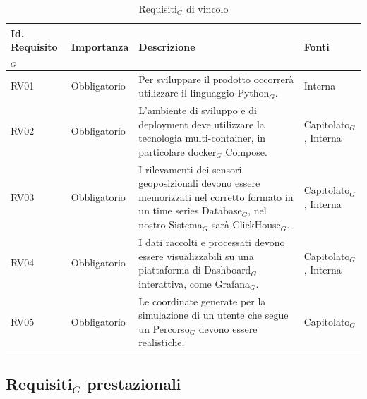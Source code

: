 \documentclass[10pt]{article}
\begin{document}
\begin{justify}
\begin{table}[H]
\centering
\renewcommand{\arraystretch}{1.5}
\begin{tabular}{|>{\centering\arraybackslash}m{2.7cm}|>{\centering\arraybackslash}m{2.7cm}|>{\centering\arraybackslash}m{6cm}|>{\centering\arraybackslash}m{2.1cm}|}
\hline
\textbf{Id. Requisito$_G$} & \textbf{Importanza} & \textbf{Descrizione} & \textbf{Fonti}\\
\hline
RV01 & Obbligatorio &  Per sviluppare il prodotto occorrerà utilizzare il linguaggio Python$_G$. & Interna\\
\hline 
RV02 & Obbligatorio & L'ambiente di sviluppo e di deployment deve utilizzare la tecnologia multi-container, in particolare docker$_G$ Compose. & Capitolato$_G$, Interna\\
\hline
RV03 & Obbligatorio & I rilevamenti dei sensori geoposizionali
devono essere memorizzati nel corretto formato in un time series Database$_G$, nel nostro Sistema$_G$ sarà ClickHouse$_G$. & Capitolato$_G$, Interna \\
\hline
RV04 & Obbligatorio & I dati raccolti e processati devono essere visualizzabili su una piattaforma di Dashboard$_G$ interattiva, come Grafana$_G$. & Capitolato$_G$, Interna\\
\hline
RV05 & Obbligatorio & Le coordinate generate per la simulazione di un utente che segue un Percorso$_G$ devono essere realistiche. & Capitolato$_G$\\
\hline
\end{tabular}

\caption{Requisiti$_G$ di vincolo}
\end{table}


\newpage
\subsection{Requisiti$_G$ prestazionali}


\end{justify}
\end{document}
